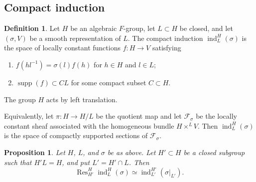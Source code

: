 \documentclass[11pt,a4paper,twoside]{amsart}
\newtheorem{proposition}[theorem]{Proposition}
\theoremstyle{definition}
\newtheorem{definition}[theorem]{Definition}
\theoremstyle{remark}
\newcommand{\bs}{\sigma}
\newcommand{\mcF}{\mathcal F}
\newcommand{\supp}{\operatorname{supp}}
\newcommand{\ind}{\operatorname{ind}}
\begin{document}
\subsection{Compact induction}
\begin{definition}\label{indu}
Let $H$ be an algebraic $F$-group, let $L\subset H$ be closed, and let $(\bs,V)$ be a smooth representation of $L$. The compact induction $\ind_L^H(\bs)$ is the space of locally constant functions $f:H\to V$ satisfying
\begin{enumerate}
\item $f(hl^{-1})=\bs(l)f(h)$ for $h\in H$ and $l\in L$;
\item $\supp(f)\subset CL$ for some compact subset $C\subset H$.
\end{enumerate}
The group $H$ acts by left translation.
\end{definition}
Equivalently, let $\pi:H\to H/L$ be the quotient map and let $\mcF_\bs$ be the locally constant sheaf associated with the homogeneous bundle $H\times^L V$. Then $\ind_L^H(\bs)$ is the space of compactly supported sections of $\mcF_\bs$.
\begin{proposition}\label{indHL}
Let $H$, $L$, and $\bs$ be as above. Let $H'\subset H$ be a closed subgroup such that $H'L=H$, and put $L'=H'\cap L$. Then
$$
\operatorname{Res}_{H'}^H\ind_L^H(\bs)\simeq\ind_{L'}^{H'}(\bs|_{L'}).
$$
\end{proposition}
\end{document}

